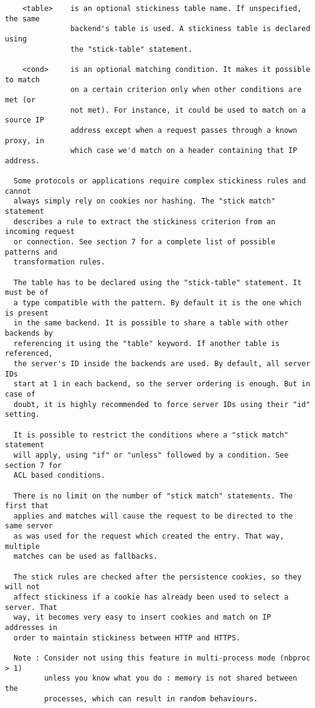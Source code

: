 \begin{verbatim}
    <table>    is an optional stickiness table name. If unspecified, the same
               backend's table is used. A stickiness table is declared using
               the "stick-table" statement.

    <cond>     is an optional matching condition. It makes it possible to match
               on a certain criterion only when other conditions are met (or
               not met). For instance, it could be used to match on a source IP
               address except when a request passes through a known proxy, in
               which case we'd match on a header containing that IP address.

  Some protocols or applications require complex stickiness rules and cannot
  always simply rely on cookies nor hashing. The "stick match" statement
  describes a rule to extract the stickiness criterion from an incoming request
  or connection. See section 7 for a complete list of possible patterns and
  transformation rules.

  The table has to be declared using the "stick-table" statement. It must be of
  a type compatible with the pattern. By default it is the one which is present
  in the same backend. It is possible to share a table with other backends by
  referencing it using the "table" keyword. If another table is referenced,
  the server's ID inside the backends are used. By default, all server IDs
  start at 1 in each backend, so the server ordering is enough. But in case of
  doubt, it is highly recommended to force server IDs using their "id" setting.

  It is possible to restrict the conditions where a "stick match" statement
  will apply, using "if" or "unless" followed by a condition. See section 7 for
  ACL based conditions.

  There is no limit on the number of "stick match" statements. The first that
  applies and matches will cause the request to be directed to the same server
  as was used for the request which created the entry. That way, multiple
  matches can be used as fallbacks.

  The stick rules are checked after the persistence cookies, so they will not
  affect stickiness if a cookie has already been used to select a server. That
  way, it becomes very easy to insert cookies and match on IP addresses in
  order to maintain stickiness between HTTP and HTTPS.

  Note : Consider not using this feature in multi-process mode (nbproc > 1)
         unless you know what you do : memory is not shared between the
         processes, which can result in random behaviours.


\end{verbatim}
